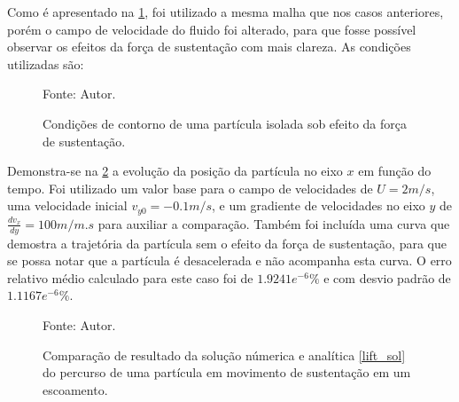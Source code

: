 Como é apresentado na \ref{lift_bc}, foi utilizado a mesma malha que nos casos anteriores, porém o campo de velocidade do fluido foi alterado, para que fosse possível observar os efeitos da força de sustentação com mais clareza.
As condições utilizadas são:
\begin{figure}[H]
    \centering
     {\raggedleft \scriptsize Fonte: Autor.}
    \caption{Condições de contorno de uma partícula isolada sob efeito da força de sustentação.}
    \label{lift_bc}
\end{figure}

Demonstra-se na \ref{lift_comp} a evolução da posição da partícula no eixo $x$ em função do tempo.
Foi utilizado um valor base para o campo de velocidades de $U=2m/s$, uma velocidade inicial $v_{y0}=-0.1m/s$, e um gradiente de velocidades no eixo $y$ de $\tfrac{dv_x}{dy}=100m/m.s$ para auxiliar a comparação.
Também foi incluída uma curva que demostra a trajetória da partícula sem o efeito da força de sustentação, para que se possa notar que a partícula é desacelerada e não acompanha esta curva.
O erro relativo médio calculado para este caso foi de $1.9241e^{-6}\%$ e com desvio padrão de $1.1167e^{-6}\%$.
\begin{figure}[H]
    \centering
     {\raggedleft \scriptsize Fonte: Autor.}
    \caption{Comparação de resultado da solução númerica e analítica \ref{lift_sol} do percurso de uma partícula em movimento de sustentação em um escoamento.}
    \label{lift_comp}
\end{figure}

